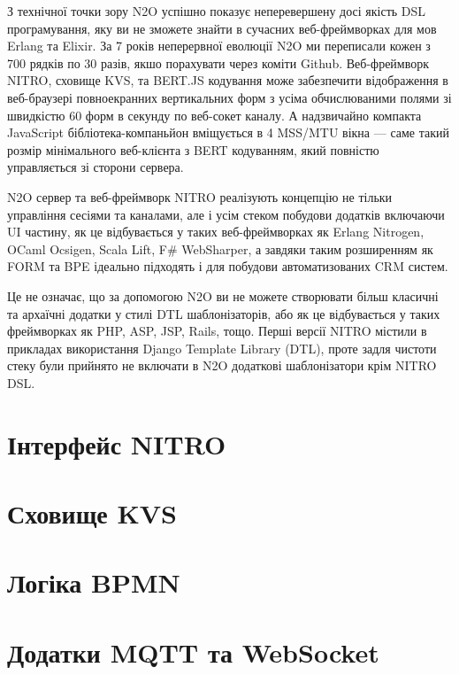 З технічної точки зору N2O успішно показує неперевершену досі якість
DSL програмування, яку ви не зможете знайти в сучасних веб-фреймворках
для мов Erlang та Elixir. За 7 років неперервної еволюції N2O ми переписали
кожен з 700 рядків по 30 разів, якшо порахувати через коміти Github.
Веб-фреймворк NITRO, сховище KVS, та BERT.JS кодування може забезпечити
відображення в веб-браузері повноекранних вертикальних форм з усіма
обчислюваними полями зі швидкістю 60 форм в секунду по веб-сокет каналу.
А надзвичайно компакта JavaScript бібліотека-компаньйон вміщується
в 4 MSS/MTU вікна — саме такий розмір мінімального веб-клієнта з BERT
кодуванням, який повністю управляється зі сторони сервера.

N2O сервер та веб-фреймворк NITRO реалізують концепцію не тільки
управління сесіями та каналами, але і усім стеком побудови додатків
включаючи UI частину, як це відбувається у таких веб-фреймворках як
Erlang Nitrogen, OCaml Ocsigen, Scala Lift, F# WebSharper, а завдяки
таким розширенням як FORM та BPE ідеально підходять і для побудови
автоматизованих CRM систем.

Це не означає, що за допомогою N2O ви не можете створювати більш
класичні та архаїчні додатки у стилі DTL шаблонізаторів, або як це
відбувається у таких фреймворках як PHP, ASP, JSP, Rails, тощо.
Перші версії NITRO містили в прикладах використання Django Template
Library (DTL), проте задля чистоти стеку були прийнято не включати
в N2O додаткові шаблонізатори крім NITRO DSL.

\section{Інтерфейс NITRO}

\section{Сховище KVS}

\section{Логіка BPMN}



\section{Додатки MQTT та WebSocket}

